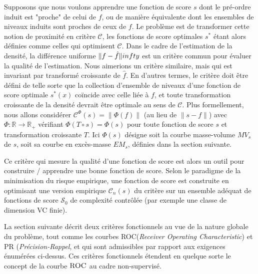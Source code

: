 \documentclass[a4paper, 12pt]{article}
\newcommand{\crit}{\mathcal{C}}
\def\S{\mathcal{S}}
\def\crit{\mathcal{C}}
\def\roc{\textsc{ROC}}
\begin{document}
Supposons que nous voulons apprendre une fonction de score $ s $ dont le pré-ordre induit est "proche" de celui de $f$, ou de manière équivalente dont les ensembles de niveaux induits sont proches de ceux de $ f $. Le problème est de transformer cette notion de proximité en critère $ \crit $, les fonctions de score optimales $ s ^ * $ étant alors définies comme celles qui optimisent $ \crit $. Dans le cadre de l'estimation de la densité, la différence uniforme $ \| f - \hat f \| \\infty $ est un critère commun pour évaluer la qualité de l'estimation. Nous aimerions un critère similaire, mais qui est invariant par transformé croissante de $ \hat f $. En d'autres termes, le critère doit être défini de telle sorte que la collection d'ensemble de niveaux d'une fonction de score optimale $ s ^ * (x) $ coïncide avec celle liée à $ f $, et toute transformation croissante de la densité devrait être optimale au sens de $ \crit $.
Plus formellement, nous allons considérer $ \crit ^ {\Phi} (s) = \| \Phi (f) \| $ (au lieu de $ \| s - f \| $) 
avec $ \Phi: \mathbb {R} \to \mathbb {R} _ + $ vérifiant $ \Phi (T \circ s) = \Phi (s) $ pour toute fonction de score $ s $ et transformation croissante $ T $. Ici $ \Phi (s) $ désigne soit la courbe masse-volume $ MV_s $ de $ s $, soit sa courbe en excès-masse $ EM_s $, définies dans la section suivante.

Ce critère qui mesure la qualité d'une fonction de score est alors un outil pour construire / apprendre une bonne fonction de score.
Selon le paradigme de la minimisation du risque empirique, une fonction de score est construite en optimisant une version empirique $ \crit_n (s) $ du critère sur un ensemble adéquat de fonctions de score $ \S_0 $ de complexité contrôlée (par exemple une classe de dimension {\sc VC} finie).

La section suivante décrit deux critères fonctionnels au vue de la nature globale du problème, tout comme les courbes \roc (\emph{Receiver Operating Characteristic}) et PR (\emph {Précision-Rappel}, et qui sont admissibles par rapport aux exigences énumérées ci-dessus. Ces critères fonctionnels étendent en quelque sorte le concept de la courbe $ \roc $ au cadre non-supervisé.
\end{document}
